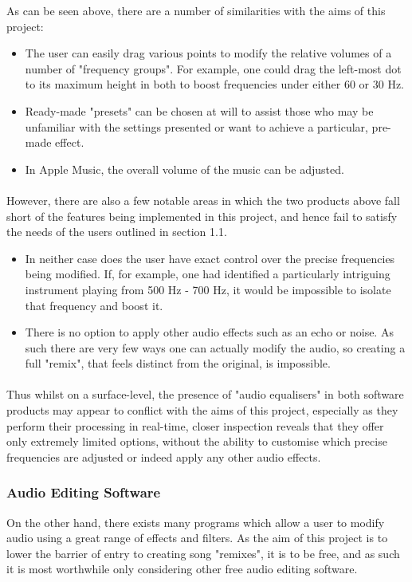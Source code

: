 As can be seen above, there are a number of similarities with the aims of this project:
\begin{itemize}
	\item The user can easily drag various points  to modify the relative volumes of a number of "frequency groups". For example, one could drag the left-most dot to its maximum height in both to boost frequencies under either 60 or 30 Hz.
	\item Ready-made "presets" can be chosen at will to assist those who may be unfamiliar with the settings presented or want to achieve a particular, pre-made effect.
	\item In Apple Music, the overall volume of the music can be adjusted.
\end{itemize}

\paragraph{}
However, there are also a few notable areas in which the two products above fall short of the features being implemented in this project, and hence fail to satisfy the needs of the users outlined in section 1.1.
\begin{itemize}
	\item In neither case does the user have exact control over the precise frequencies being modified.  If, for example, one had identified a particularly intriguing instrument playing from 500 Hz - 700 Hz, it would be impossible to isolate that frequency and boost it.
	\item There is no option to apply other audio effects such as an echo or noise. As such there are very few ways one can actually modify the audio, so creating a full "remix", that feels distinct from the original, is impossible.
\end{itemize}

\paragraph{}
Thus whilst on a surface-level, the presence of "audio equalisers" in both software products may appear to conflict with the aims of this project, especially as they perform their processing in real-time, closer inspection reveals that they offer only extremely limited options, without the ability to customise which precise frequencies are adjusted or indeed apply any other audio effects.

\subsubsection{Audio Editing Software}
On the other hand, there exists many programs which allow a user to modify audio using a great range of effects and filters. As the aim of this project is to lower the barrier of entry to creating song "remixes", it is to be free, and as such it is most worthwhile only considering other free audio editing software.

